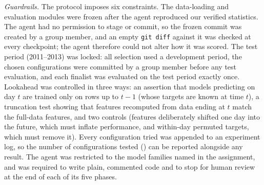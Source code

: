 \textit{Guardrails.} The protocol imposes six constraints. The data-loading and evaluation modules were frozen after the agent reproduced our verified statistics. The agent had no permission to stage or commit, so the frozen commit was created by a group member, and an empty \texttt{git diff} against it was checked at every checkpoint; the agent therefore could not alter how it was scored. The test period (2011--2013) was locked: all selection used a development period, the chosen configurations were committed by a group member before any test evaluation, and each finalist was evaluated on the test period exactly once. Lookahead was controlled in three ways: an assertion that models predicting on day $t$ are trained only on rows up to $t-1$ (whose targets are known at time $t$), a truncation test showing that features recomputed from data ending at $t$ match the full-data features, and two controls (features deliberately shifted one day into the future, which must inflate performance, and within-day permuted targets, which must remove it). Every configuration tried was appended to an experiment log, so the number of configurations tested () can be reported alongside any result. The agent was restricted to the model families named in the assignment, and was required to write plain, commented code and to stop for human review at the end of each of its five phases.

